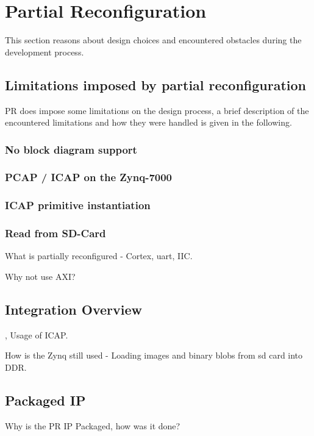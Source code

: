 \section{Partial Reconfiguration}
This section reasons about design choices and encountered obstacles during the development process.

\subsection{Limitations imposed by partial reconfiguration}
\gls{PR} does impose some limitations on the design process, a brief description of the encountered limitations and how they were handled is given in the following.

\subsubsection{No block diagram support}
\subsubsection{PCAP / ICAP on the Zynq-7000}
\subsubsection{ICAP primitive instantiation}
\subsubsection{Read from SD-Card}

What is partially reconfigured - Cortex, uart, IIC.

Why not use AXI?

\subsection{Integration Overview}
\cite{xilinx_vivado_2018-1}, \cite{xilinx_vivado_2018}
Usage of \gls{ICAP}.

How is the Zynq still used - Loading images and binary blobs from sd card into DDR.

\subsection{Packaged IP}
Why is the PR IP Packaged, how was it done? \cite{xilinx_ug1118-vivado-creating-packaging-custom-ip.pdf_nodate}
